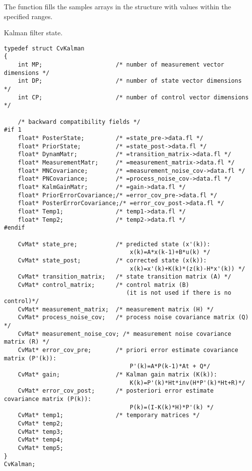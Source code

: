 
\begin{description}
\end{description}

The function fills the samples arrays in the structure  with values within the specified ranges.
\fi

\label{CvKalman}
Kalman filter state.

\begin{lstlisting}
typedef struct CvKalman
{
    int MP;                     /* number of measurement vector dimensions */
    int DP;                     /* number of state vector dimensions */
    int CP;                     /* number of control vector dimensions */

    /* backward compatibility fields */
#if 1
    float* PosterState;         /* =state_pre->data.fl */
    float* PriorState;          /* =state_post->data.fl */
    float* DynamMatr;           /* =transition_matrix->data.fl */
    float* MeasurementMatr;     /* =measurement_matrix->data.fl */
    float* MNCovariance;        /* =measurement_noise_cov->data.fl */
    float* PNCovariance;        /* =process_noise_cov->data.fl */
    float* KalmGainMatr;        /* =gain->data.fl */
    float* PriorErrorCovariance;/* =error_cov_pre->data.fl */
    float* PosterErrorCovariance;/* =error_cov_post->data.fl */
    float* Temp1;               /* temp1->data.fl */
    float* Temp2;               /* temp2->data.fl */
#endif

    CvMat* state_pre;           /* predicted state (x'(k)):
                                    x(k)=A*x(k-1)+B*u(k) */
    CvMat* state_post;          /* corrected state (x(k)):
                                    x(k)=x'(k)+K(k)*(z(k)-H*x'(k)) */
    CvMat* transition_matrix;   /* state transition matrix (A) */
    CvMat* control_matrix;      /* control matrix (B)
                                   (it is not used if there is no control)*/
    CvMat* measurement_matrix;  /* measurement matrix (H) */
    CvMat* process_noise_cov;   /* process noise covariance matrix (Q) */
    CvMat* measurement_noise_cov; /* measurement noise covariance matrix (R) */
    CvMat* error_cov_pre;       /* priori error estimate covariance matrix (P'(k)):
                                    P'(k)=A*P(k-1)*At + Q*/
    CvMat* gain;                /* Kalman gain matrix (K(k)):
                                    K(k)=P'(k)*Ht*inv(H*P'(k)*Ht+R)*/
    CvMat* error_cov_post;      /* posteriori error estimate covariance matrix (P(k)):
                                    P(k)=(I-K(k)*H)*P'(k) */
    CvMat* temp1;               /* temporary matrices */
    CvMat* temp2;
    CvMat* temp3;
    CvMat* temp4;
    CvMat* temp5;
}
CvKalman;
\end{lstlisting}

